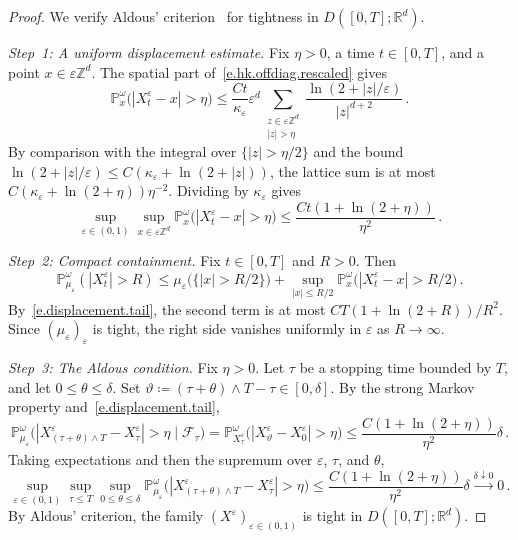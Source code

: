 \documentclass[11pt]{amsart}
\theoremstyle{plain}
\theoremstyle{definition}
\theoremstyle{remark}
\newcommand{\Zd}{\mathbb{Z}^d}
\newcommand{\Rd}{\mathbb{R}^d}
\newcommand{\eps}{\varepsilon}
\renewcommand{\P}{\mathbb{P}}
\begin{document}
	\begin{proof}
		We verify Aldous' criterion~\cite[Theorem~16.10]{Billingsley1999} for tightness in $D([0,T]; \Rd)$.
		
		\smallskip
		
		\emph{Step~1: A uniform displacement estimate.}
		Fix $\eta > 0$, a time $t \in [0,T]$, and a point $x \in \eps\Zd$.
		The spatial part of~\eqref{e.hk.offdiag.rescaled} gives
		\[
		\P_x^\omega\bigl(|X_t^\eps - x| > \eta\bigr)
		\le \frac{Ct}{\kappa_\eps}
		\eps^d \sum_{\substack{z \in \eps\Zd\\|z|>\eta}}
		\frac{\ln(2+|z|/\eps)}{|z|^{d+2}}\,.
		\]
		By comparison with the integral over $\{|z| > \eta/2\}$ and the bound $\ln(2+|z|/\eps) \le C(\kappa_\eps + \ln(2+|z|))$, the lattice sum is at most $C(\kappa_\eps + \ln(2+\eta))\eta^{-2}$.
		Dividing by $\kappa_\eps$ gives
		\begin{equation}
			\label{e.displacement.tail}
			\sup_{\eps \in (0,1)}\sup_{x \in \eps\Zd}
			\P_x^\omega\bigl(|X_t^\eps - x| > \eta\bigr)
			\le \frac{Ct(1+\ln(2+\eta))}{\eta^2}\,.
		\end{equation}
		
		\smallskip
		
		\emph{Step~2: Compact containment.}
		Fix $t \in [0,T]$ and $R > 0$.
		Then
		\[
		\P_{\mu_\eps}^\omega(|X_t^\eps| > R)
		\le \mu_\eps\bigl(\{|x| > R/2\}\bigr)
		+ \sup_{|x| \le R/2} \P_x^\omega\bigl(|X_t^\eps - x| > R/2\bigr)\,.
		\]
		By~\eqref{e.displacement.tail}, the second term is at most $CT(1+\ln(2+R))/R^2$.
		Since $(\mu_\eps)_\eps$ is tight, the right side vanishes uniformly in $\eps$ as $R \to \infty$.
		
		\smallskip
		
		\emph{Step~3: The Aldous condition.}
		Fix $\eta > 0$.
		Let $\tau$ be a stopping time bounded by $T$, and let $0 \le \theta \le \delta$.
		Set $\vartheta \coloneqq (\tau + \theta) \wedge T - \tau \in [0, \delta]$.
		By the strong Markov property and~\eqref{e.displacement.tail},
		\[
		\P_{\mu_\eps}^\omega\bigl(|X_{(\tau+\theta)\wedge T}^\eps - X_\tau^\eps| > \eta \mid \mathcal{F}_\tau\bigr)
		= \P_{X_\tau^\eps}^\omega\bigl(|X_\vartheta^\eps - X_0^\eps| > \eta\bigr)
		\le \frac{C(1+\ln(2+\eta))}{\eta^2}\delta\,.
		\]
		Taking expectations and then the supremum over $\eps$, $\tau$, and $\theta$,
		\[
		\sup_{\eps \in (0,1)}
		\sup_{\tau \le T}
		\sup_{0 \le \theta \le \delta}
		\P_{\mu_\eps}^\omega\bigl(|X_{(\tau+\theta)\wedge T}^\eps - X_\tau^\eps| > \eta\bigr)
		\le \frac{C(1 + \ln(2+\eta))}{\eta^2}\delta \xrightarrow{\delta\downarrow0} 0\,.
		\]
		By Aldous' criterion, the family $(X^\eps)_{\eps \in (0,1)}$ is tight in $D([0,T]; \Rd)$.
	\end{proof}
	
\end{document}
